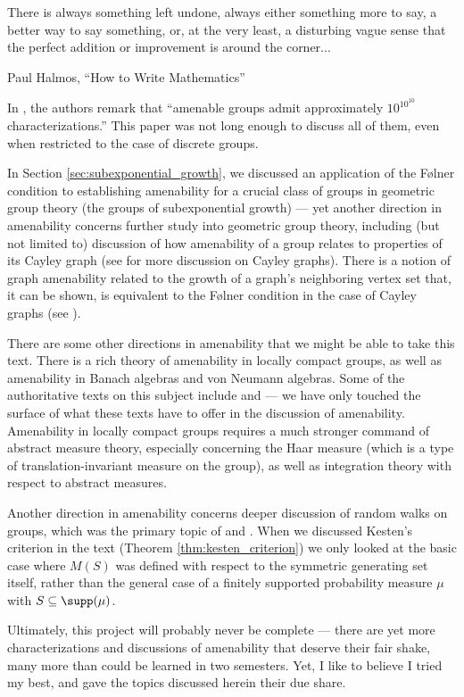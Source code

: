 \epigraph{There is always something left undone, always either something more to say, a better way to say something, or, at the very least, a disturbing vague sense that the perfect addition or improvement is around the corner...}{Paul Halmos, ``How to Write Mathematics''}
In \cite[48]{brown_and_ozawa}, the authors remark that ``amenable groups admit approximately $10^{10^{10}}$ characterizations.'' This paper was not long enough to discuss all of them, even when restricted to the case of discrete groups.\newline

In Section \ref{sec:subexponential_growth}, we discussed an application of the Følner condition to establishing amenability for a crucial class of groups in geometric group theory (the groups of subexponential growth) --- yet another direction in amenability concerns further study into geometric group theory, including (but not limited to) discussion of how amenability of a group relates to properties of its Cayley graph (see \cite[Section 3.2]{loh_geometric_group_theory} for more discussion on Cayley graphs). There is a notion of graph amenability related to the growth of a graph's neighboring vertex set that, it can be shown, is equivalent to the Følner condition in the case of Cayley graphs (see \cite{monfared_cayley_graphs}).\newline

There are some other directions in amenability that we might be able to take this text. There is a rich theory of amenability in locally compact groups, as well as amenability in Banach algebras and von Neumann algebras. Some of the authoritative texts on this subject include \cite{kazhdan_property_t} and \cite{amenable_banach_algebras} --- we have only touched the surface of what these texts have to offer in the discussion of amenability. Amenability in locally compact groups requires a much stronger command of abstract measure theory, especially concerning the Haar measure (which is a type of translation-invariant measure on the group), as well as integration theory with respect to abstract measures.\newline

Another direction in amenability concerns deeper discussion of random walks on groups, which was the primary topic of \cite{kesten_means} and \cite{kesten_random_walks}. When we discussed Kesten's criterion in the text (Theorem \ref{thm:kesten_criterion}) we only looked at the basic case where $M(S)$ was defined with respect to the symmetric generating set itself, rather than the general case of a finitely supported probability measure $\mu$ with $S\subseteq \supp(\mu)$.\newline

Ultimately, this project will probably never be complete --- there are yet more characterizations and discussions of amenability that deserve their fair shake, many more than could be learned in two semesters. Yet, I like to believe I tried my best, and gave the topics discussed herein their due share.
